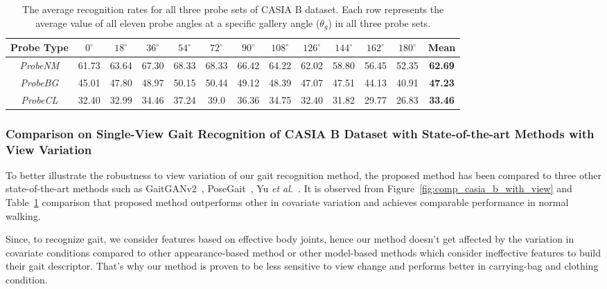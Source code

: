 \begin{table}[t]
	\centering
	\caption{The average recognition rates for all three probe sets of CASIA B dataset. Each row represents the average value of all eleven probe angles at a specific gallery angle ($ \theta_g $) in all three probe sets. \label{table:comp_casia_b_with_view}}
	
	{\begin{tabular*}{\textwidth}{ccccccccccccc}\hline
			Probe Type &${0^{\circ}}$	&${18^{\circ}}$ &${36^{\circ}}$	&${54^{\circ}}$	&${72^{\circ}}$	&${90^{\circ}}$	
			&${108^{\circ}}$ &${126^{\circ}}$ &${144^{\circ}}$ &${162^{\circ}}$	&${180^{\circ}}$ & Mean \\
			\hline
			\textit{ProbeNM} &61.73 &63.64 &67.30 &68.33 &68.33 &66.42 &64.22 &62.02 &58.80 &56.45 &52.35 &\textbf{62.69} \\
			\rule{0pt}{2ex}\textit{ProbeBG}	&45.01 &47.80 &48.97 &50.15 &50.44 &49.12 &48.39 &47.07 &47.51 &44.13 &40.91 &\textbf{47.23} \\
			
			\rule{0pt}{2ex}\textit{ProbeCL} &32.40 &32.99 &34.46 &37.24 &39.0 &36.36 &34.75 &32.40 &31.82 &29.77 &26.83 &\textbf{33.46} \\
			\hline
	\end{tabular*}}{}
\end{table}



\subsubsection{Comparison on Single-View Gait Recognition of CASIA B Dataset with State-of-the-art Methods with View Variation}
To better illustrate the robustness to view variation of our gait recognition method, the proposed method has been compared to three other state-of-the-art methods such as GaitGANv2~\cite{Yu_19}, PoseGait~\cite{Liao_19}, Yu \textit{et al.}~\cite{Yu_17_space}.  It is observed from Figure~\ref{fig:comp_casia_b_with_view} and Table~\ref{table:comp_casia_b_with_view} comparison that proposed method outperforms other in covariate variation and achieves comparable performance in normal walking. 

Since, to recognize gait, we consider features based on effective body joints, hence our method doesn't get affected by the variation in covariate conditions compared to other appearance-based method or other model-based methods which consider ineffective features to build their gait descriptor. That’s why our method is proven to be less sensitive to view change and performs better in carrying-bag and clothing condition. 

